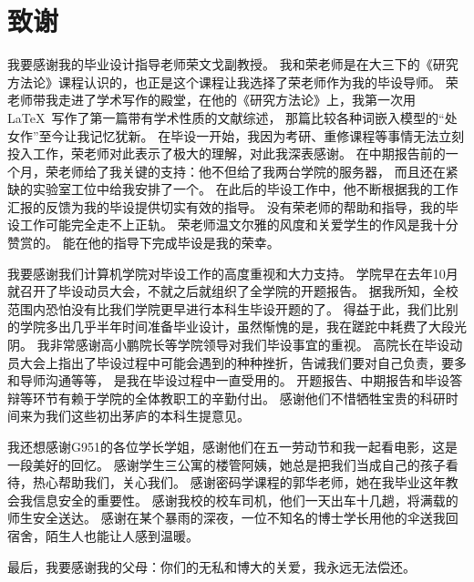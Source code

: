 \chapter*{致谢}
我要感谢我的毕业设计指导老师荣文戈副教授。
我和荣老师是在大三下的《研究方法论》课程认识的，也正是这个课程让我选择了荣老师作为我的毕设导师。
荣老师带我走进了学术写作的殿堂，在他的《研究方法论》上，我第一次用\LaTeX\ 写作了第一篇带有学术性质的文献综述，
那篇比较各种词嵌入模型的“处女作”至今让我记忆犹新。
在毕设一开始，我因为考研、重修课程等事情无法立刻投入工作，荣老师对此表示了极大的理解，对此我深表感谢。
在中期报告前的一个月，荣老师给了我关键的支持：他不但给了我两台学院的服务器，
而且还在紧缺的实验室工位中给我安排了一个。
在此后的毕设工作中，他不断根据我的工作汇报的反馈为我的毕设提供切实有效的指导。
没有荣老师的帮助和指导，我的毕设工作可能完全走不上正轨。
荣老师温文尔雅的风度和关爱学生的作风是我十分赞赏的。
能在他的指导下完成毕设是我的荣幸。

我要感谢我们计算机学院对毕设工作的高度重视和大力支持。
学院早在去年10月就召开了毕设动员大会，不就之后就组织了全学院的开题报告。
据我所知，全校范围内恐怕没有比我们学院更早进行本科生毕设开题的了。
得益于此，我们比别的学院多出几乎半年时间准备毕业设计，虽然惭愧的是，我在蹉跎中耗费了大段光阴。
我非常感谢高小鹏院长等学院领导对我们毕设事宜的重视。
高院长在毕设动员大会上指出了毕设过程中可能会遇到的种种挫折，告诫我们要对自己负责，要多和导师沟通等等，
是我在毕设过程中一直受用的。
开题报告、中期报告和毕设答辩等环节有赖于学院的全体教职工的辛勤付出。
感谢他们不惜牺牲宝贵的科研时间来为我们这些初出茅庐的本科生提意见。

我还想感谢G951的各位学长学姐，感谢他们在五一劳动节和我一起看电影，这是一段美好的回忆。
感谢学生三公寓的楼管阿姨，她总是把我们当成自己的孩子看待，热心帮助我们，关心我们。
感谢密码学课程的郭华老师，她在我毕业这年教会我信息安全的重要性。
感谢我校的校车司机，他们一天出车十几趟，将满载的师生安全送达。
感谢在某个暴雨的深夜，一位不知名的博士学长用他的伞送我回宿舍，陌生人也能让人感到温暖。

最后，我要感谢我的父母：你们的无私和博大的关爱，我永远无法偿还。
